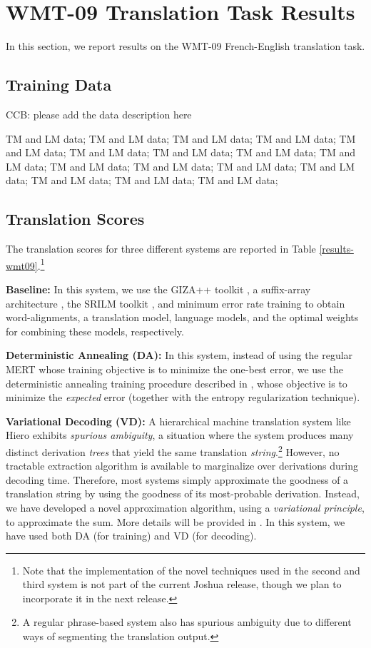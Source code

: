 \documentclass[11pt]{article}
\begin{document}
\section{WMT-09 Translation Task Results}
In this section, we report results on the WMT-09 French-English translation task.
\subsection{Training Data}
CCB: please add the data description here

TM and LM data; TM and LM data; TM and LM data; TM and LM data; TM and LM data; TM and LM data; TM and LM data; TM and LM data; TM and LM data; TM and LM data; TM and LM data; TM and LM data; TM and LM data; TM and LM data; TM and LM data; TM and LM data;


\subsection{Translation Scores}
The translation scores for three different systems are reported in Table \ref{results-wmt09}.\footnote{Note that the implementation of the novel techniques used in the second and third system is not part of the current Joshua release, though we plan to incorporate it in the next release.}


\textbf{Baseline: } In this system, we use the GIZA++ toolkit \cite{giza}, a suffix-array architecture \cite{adam-suffix}, the SRILM toolkit \cite{srilm}, and minimum error rate training \cite{discriminative-mert} to obtain word-alignments, a translation model, language models, and the optimal weights for combining these models, respectively.

\textbf{Deterministic Annealing (DA): } In this system, instead of using the regular MERT \cite{discriminative-mert} whose training objective is to minimize the one-best error, we use the deterministic annealing training procedure described in , whose objective is to minimize the \emph{expected} error (together with the entropy regularization technique).

\textbf{Variational Decoding (VD): }  A hierarchical machine translation system like Hiero exhibits \emph{spurious ambiguity}, a situation where the system
produces many distinct derivation \emph{trees} that yield the same translation \emph{string}.\footnote{A regular phrase-based system also has spurious ambiguity due to different ways of segmenting the translation output.} However, no tractable extraction algorithm is available to marginalize over derivations during decoding time. Therefore, most systems simply approximate the goodness of a translation string by using the goodness of its most-probable derivation. Instead, we have developed a novel approximation algorithm, using a \emph{variational principle}, to approximate the sum.
More details will be provided in . In this system, we have used both DA (for training) and VD (for decoding).
\end{document}
